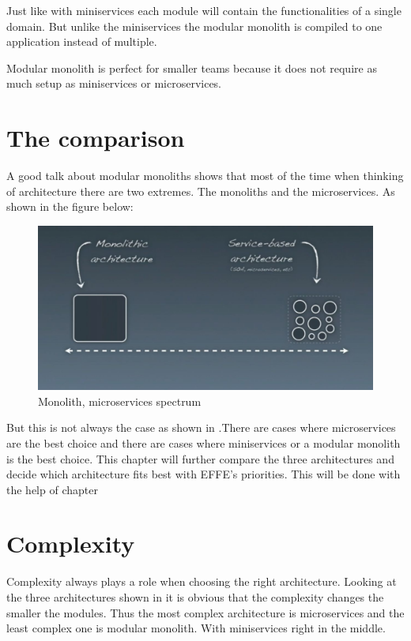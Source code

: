 Just like with miniservices each module will contain the functionalities of a single domain. But unlike the miniservices the modular monolith is compiled to one application instead of multiple.

Modular monolith is perfect for smaller teams because it does not require as much setup as miniservices or microservices.

\section{The comparison}
\label{sec:Comparison}

A good talk about modular monoliths \cite{modularMonolithTalk} shows that most of the time when thinking of architecture there are two extremes. The monoliths and the microservices. As shown in the figure below:
\begin{figure}[H]
	\includegraphics[width=\linewidth]{microservices-spectrum.png}
	\caption{Monolith, microservices spectrum \cite{modularMonolithTalk}}
\end{figure}

But this is not always the case as shown in .There are cases where microservices are the best choice and there are cases where miniservices or a modular monolith is the best choice. This chapter will further compare the three architectures and decide which architecture fits best with EFFE's priorities. This will be done with the help of chapter 

\section{Complexity}
\label{sec:Complexity}

Complexity always plays a role when choosing the right architecture. Looking at the three architectures shown in  it is obvious that the complexity changes the smaller the modules. Thus the most complex architecture is microservices and the least complex one is modular monolith. With miniservices right in the middle.

